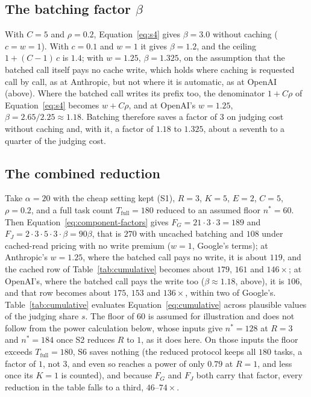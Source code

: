 \documentclass[11pt]{article}
\begin{document}
\subsection{The batching factor \texorpdfstring{$\beta$}{beta}}

With $C = 5$ and $\rho = 0.2$, Equation~\ref{eq:s4} gives $\beta = 3.0$ without caching
($c = w = 1$). With $c = 0.1$ and $w = 1$ it gives $\beta = 1.2$, and the ceiling
$1 + (C-1)\,c$ is $1.4$; with $w = 1.25$, $\beta = 1.325$, on the assumption that the batched call itself pays no cache write, which holds where caching is requested call by call, as at Anthropic, but not where it is automatic, as at OpenAI (above). Where the batched call writes its prefix too, the denominator $1 + C\rho$ of Equation~\ref{eq:s4} becomes $w + C\rho$, and at OpenAI's $w = 1.25$, $\beta = 2.65/2.25 \approx 1.18$. Batching therefore saves a
factor of $3$ on judging cost without caching and, with it, a factor of $1.18$ to $1.325$, about a seventh to a quarter of the judging cost.

\subsection{The combined reduction}

Take $\alpha = 20$ with the cheap setting kept (S1), $R = 3$, $K = 5$, $E = 2$, $C = 5$, $\rho = 0.2$, and a full task
count $T_{\text{full}} = 180$ reduced to an assumed floor $n^* = 60$. Then
Equation~\ref{eq:component-factors} gives $F_G = 21 \cdot 3 \cdot 3 = 189$ and $F_J = 2
\cdot 3 \cdot 5 \cdot 3 \cdot \beta = 90\beta$, that is $270$ with uncached batching and
$108$ under cached-read pricing with no write premium ($w = 1$, Google's terms); at Anthropic's $w = 1.25$, where the batched call pays no write, it is about $119$, and the cached row of Table~\ref{tab:cumulative} becomes about $179$, $161$ and $146\times$; at OpenAI's, where the batched call pays the write too ($\beta \approx 1.18$, above), it is $106$, and that row becomes about $175$, $153$ and $136\times$, within two of Google's. Table~\ref{tab:cumulative} evaluates
Equation~\ref{eq:cumulative} across plausible values of the judging share $s$. The floor of $60$ is assumed for illustration and does not follow from the power calculation below, whose inputs give $n^* = 128$ at $R = 3$ and $n^* = 184$ once S2 reduces $R$ to $1$, as it does here. On those inputs the floor exceeds $T_{\text{full}} = 180$, S6 saves nothing (the reduced protocol keeps all $180$ tasks, a factor of $1$, not $3$, and even so reaches a power of only $0.79$ at $R = 1$, and less once its $K = 1$ is counted), and because $F_G$ and $F_J$ both carry that factor, every reduction in the table falls to a third, $46$--$74\times$.
\end{document}
